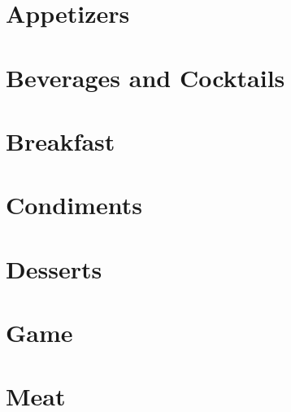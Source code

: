 \documentclass{report}
\begin{document}
    \tableofcontents

    \chapter{Appetizers}

    
    

    \chapter{Beverages and Cocktails}

    
    
    

    \chapter{Breakfast}

    
    

    \chapter{Condiments}

    
    
    
    

    \chapter{Desserts}

    
    
    
    

    \chapter{Game}

    

    \chapter{Meat}
\end{document}
